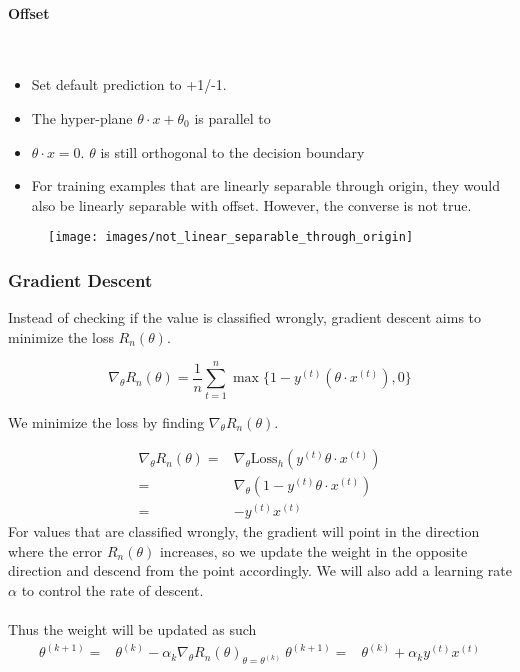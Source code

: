 \documentclass[a4paper]{article}
\begin{document}
\paragraph{Offset}\mbox{}\\
\begin{itemize}
	\item Set default prediction to +1/-1.
	\item The hyper-plane $\theta\cdot x + \theta_0$ is parallel to \item $\theta\cdot x = 0$.
	$\theta$ is still orthogonal to the decision boundary
	\item For training examples that are linearly separable through origin, they would also be linearly separable with offset. However, the converse is not true.
\end{itemize}
\begin{figure}[H]
	\centering
	\texttt{[image: images/not\_linear\_separable\_through\_origin]}
	\label{fig:notlinearseparablethroughorigin}
\end{figure}
\subsubsection{Gradient Descent}
Instead of checking if the value is classified wrongly, gradient descent aims to minimize the loss $R_n(\theta)$. 

$$ \nabla_\theta R_n(\theta) =\frac{1}{n} \sum_{t=1}^n \max\{1 - y^{(t)} (\theta\cdot x^{(t)}), 0 \}  $$

\noindent We minimize the loss by finding $\nabla_\theta R_n(\theta)$. 

\begin{align*}
\nabla_\theta R_n(\theta) =& \nabla_\theta \text{Loss}_h(y^{(t)}\theta\cdot x^{(t)}) \\
=& \nabla_\theta(1-y^{(t)}\theta\cdot x^{(t)}) \\
=& -y^{(t)}x^{(t)}
\end{align*}
For values that are classified wrongly, the gradient will point in the direction where the error $R_n(\theta)$ increases, so we update the weight in the opposite direction and descend from the point accordingly. We will also add a learning rate $\alpha$ to control the rate of descent.\\
\\
\noindent Thus the weight will be updated as such $$ \begin{aligned} \theta^{(k+1)} = & \theta^{(k)} - \alpha_k\nabla_\theta R_n(\theta)_{\theta=\theta^{(k)}} \ \theta^{(k+1)} = & \theta^{(k)} + \alpha_k y^{(t)}x^{(t)} \end{aligned} $$
\end{document}
